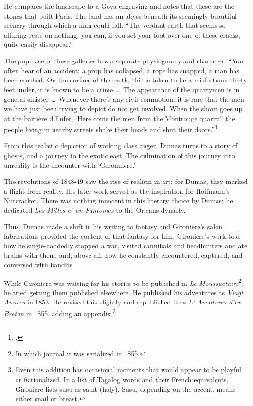 He compares the landscape to a Goya engraving and notes that these are the stones that built Paris. The land has an abyss beneath its seemingly beautiful scenery through which a man could fall. \enquote{The verdant earth that seems so alluring rests on nothing; you can, if you set your foot over one of these cracks, quite easily disappear.}

The populace of these galleries has a separate physiognomy and character. \enquote{You often hear of an accident: a prop has collapsed, a rope has snapped, a man has been crushed. On the surface of the earth, this is taken to be a misfortune: thirty feet under, it is known to be a crime \ldots\ The appearance of the quarrymen is in general sinister \ldots\ Whenever there's any civil commotion, it is rare that the men we have just been trying to depict do not get involved. When the shout goes up at the barri\`ere d'Enfer, \enquote{Here come the men from the Montrouge quarry!} the people living in nearby streets shake their heads and shut their doors.}\footcite[4-6]{Dumas2004}

From this realistic depiction of working class anger, Dumas turns to a story of ghosts, and a journey to the exotic east. The culmination of this journey into unreality is the encounter with \enquote*{Geronniere.}

The revolutions of 1848-49 saw the rise of realism in art; for Dumas, they marked a flight from reality. His later work served as the inspiration for Hoffmann's Nutcracker. There was nothing innocent in this literary choice by Dumas; he dedicated \textit{Les Milles et un Fantomes} to the Orleans dynasty.

Thus, Dumas made a shift in his writing to fantasy and Gironiere's salon fabrications provided the content of that fantasy for him. Gironiere's work told how he single-handedly stopped a war, visited cannibals and headhunters and ate brains with them, and, above all, how he constantly encountered, captured, and conversed with bandits.

While Gironiere was waiting for his stories to be published in \textit{Le Mousquetaire}\footnote{In which journal it was serialized in 1855.}, he tried getting them published elsewhere. He published his adventures as \textit{Vingt Ann\'ees} in 1853. He revised this slightly and republished it as \textit{L' Aventures d'un Breton} in 1855, adding an appendix.\footnote{Even this addition has occasional moments that would appear to be playful or fictionalized. In a list of Tagalog words and their French equivalents, Gironiere lists susu as saint (holy). Susu, depending on the accent, means either snail or breast.}

